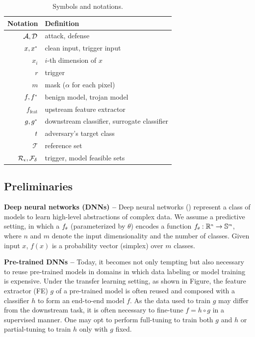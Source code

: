 \documentclass[compsoc,conference,a4paper,10pt,times]{IEEEtran}
\begin{document}
\begin{table}[!ht]{\footnotesize
    \centering
       \renewcommand{\arraystretch}{1.2}
    \begin{tabular}{r|l}
    {Notation} & {Definition}\\
    \hline
    \hline
    ${\mathcal{A}}, {\mathcal{D}}$ & attack, defense\\
    $x, \ux$ & clean input, trigger input \\
    $x_i$ & $i$-th dimension of $x$\\
    $r$ & trigger \\
    $m$ & mask ($\alpha$ for each pixel) \\
    $f, \uf$ & benign model, trojan model\\
    $f_{\text{feat}}$ & upstream feature extractor\\
    $g, \sg$ & downstream classifier, surrogate classifier\\
    $t$ & adversary's target class \\
    $\mathcal{T}$ & reference set\\
    ${\mathcal{R}}_\epsilon, {\mathcal{F}}_\delta$ & trigger, model feasible sets
    \end{tabular}
    \caption{Symbols and notations. \label{tab:symbol}}}
\end{table}
    



\subsection{Preliminaries}

{\bf Deep neural networks (DNNs) --} 
Deep neural networks (\dnns) represent a class of \ml models to learn high-level abstractions of complex data. We assume a predictive setting, in which a \dnn $\ssub{f}{\theta}$ (parameterized by $\theta$) encodes a function $\ssub{f}{\theta}: \ssup{\sR}{n} \rightarrow \ssup{\sS}{m}$, where $n$ and $m$ denote the input dimensionality and the number of classes. Given input $x$, $f(x)$ is a probability vector (simplex) over $m$ classes.


\vspace{2pt}
{\bf Pre-trained DNNs --} Today, it becomes not only tempting but also necessary to reuse pre-trained models in domains in which data labeling or model training is expensive. Under the transfer learning setting, as shown in Figure, the feature extractor (FE) $g$ of a pre-trained model is often reused and composed with a classifier $h$ to form an end-to-end model $f$. As the data used to train $g$ may differ from the downstream task, it is often necessary to fine-tune $f = h \circ g$ in a supervised manner. One may opt to perform full-tuning to train both $g$ and $h$ or partial-tuning to train $h$ only with $g$ fixed.
\end{document}
